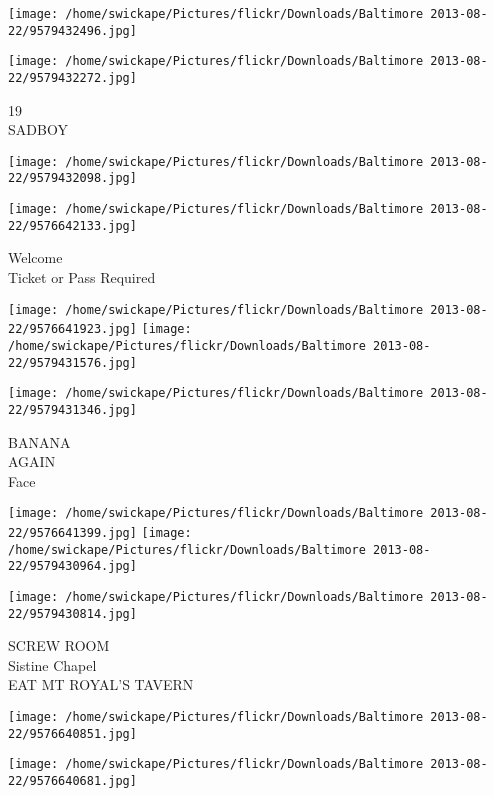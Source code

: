 \documentclass[10pt,letterpaper]{article}
\begin{document}
\texttt{[image: /home/swickape/Pictures/flickr/Downloads/Baltimore 2013-08-22/9579432496.jpg]}

\vspace{0.25in}
\texttt{[image: /home/swickape/Pictures/flickr/Downloads/Baltimore 2013-08-22/9579432272.jpg]}

19\\
SADBOY\\
\pagebreak

\texttt{[image: /home/swickape/Pictures/flickr/Downloads/Baltimore 2013-08-22/9579432098.jpg]}

\vspace{0.25in}
\texttt{[image: /home/swickape/Pictures/flickr/Downloads/Baltimore 2013-08-22/9576642133.jpg]}

Welcome\\
Ticket or Pass Required\\
\pagebreak

\texttt{[image: /home/swickape/Pictures/flickr/Downloads/Baltimore 2013-08-22/9576641923.jpg]}
\texttt{[image: /home/swickape/Pictures/flickr/Downloads/Baltimore 2013-08-22/9579431576.jpg]}

\vspace{0.25in}
\texttt{[image: /home/swickape/Pictures/flickr/Downloads/Baltimore 2013-08-22/9579431346.jpg]}

BANANA\\
AGAIN\\
Face\\
\pagebreak

\texttt{[image: /home/swickape/Pictures/flickr/Downloads/Baltimore 2013-08-22/9576641399.jpg]}
\texttt{[image: /home/swickape/Pictures/flickr/Downloads/Baltimore 2013-08-22/9579430964.jpg]}

\vspace{0.25in}
\texttt{[image: /home/swickape/Pictures/flickr/Downloads/Baltimore 2013-08-22/9579430814.jpg]}

SCREW ROOM\\
Sistine Chapel\\
EAT MT ROYAL'S TAVERN\\
\pagebreak

\texttt{[image: /home/swickape/Pictures/flickr/Downloads/Baltimore 2013-08-22/9576640851.jpg]}

\vspace{0.25in}
\texttt{[image: /home/swickape/Pictures/flickr/Downloads/Baltimore 2013-08-22/9576640681.jpg]}
\end{document}
